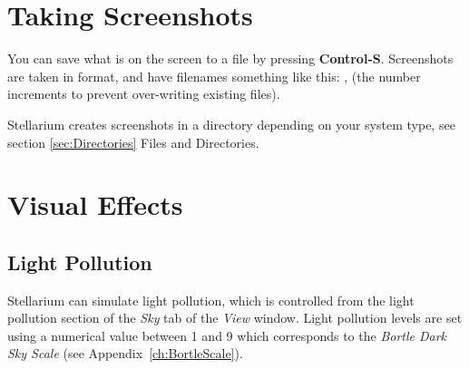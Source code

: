 \section{Taking Screenshots}
\label{sec:interface:screenshots}

You can save what is on the screen to a file by pressing
\textbf{Control-S}. Screenshots are taken in  format, and
have filenames something like this: ,
 (the number increments to prevent
over-writing existing files).

Stellarium creates screenshots in a directory depending on
your system type, see section
\ref{sec:Directories} Files and Directories.




\section{Visual Effects}
\label{ch:VisualEffects}


\subsection{Light Pollution}
\label{sec:LightPollution}

Stellarium can simulate light pollution, which is controlled from the
light pollution section of the \emph{Sky} tab of the \emph{View} window.
Light pollution levels are set using a numerical value between 1 and 9
which corresponds to the \emph{Bortle Dark Sky Scale} (see Appendix~\ref{ch:BortleScale}).




